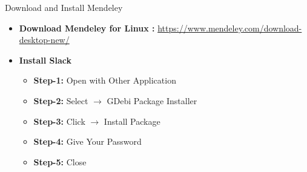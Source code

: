 \begin{frame}[t]{Download and Install Mendeley}
	\begin{itemize}
		\item \textbf{Download Mendeley for Linux :} 
		\url{https://www.mendeley.com/download-desktop-new/}
		\item \textbf{Install Slack} 
		\begin{itemize}
		\item \textbf{Step-1:}  Open with Other Application 
		\item \textbf{Step-2:}  Select $\rightarrow$ GDebi Package Installer
		\item \textbf{Step-3:}  Click $\rightarrow$ Install Package 
		\item \textbf{Step-4:}  Give Your Password 
		\item \textbf{Step-5:}  Close 
	\end{itemize}
	\end{itemize}
\end{frame}




